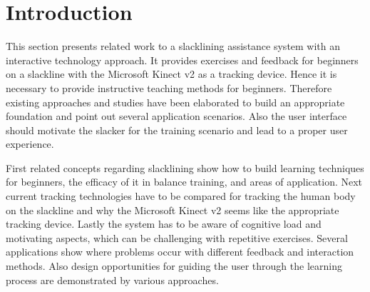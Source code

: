 \section{Introduction}

This section presents related work to a slacklining assistance system with an interactive technology approach. It provides exercises and feedback for beginners on a slackline with the Microsoft Kinect v2 as a tracking device. Hence it is necessary to provide instructive teaching methods for beginners. Therefore existing approaches and studies have been elaborated to build an appropriate foundation and point out several application scenarios. Also the user interface should motivate the slacker for the training scenario and lead to a proper user experience.

First related concepts regarding slacklining show how to build learning techniques for beginners, the efficacy of it in balance training, and areas of application. Next current tracking technologies have to be compared for tracking the human body on the slackline and why the Microsoft Kinect v2 seems like the appropriate tracking device. Lastly the system has to be aware of cognitive load and motivating aspects, which can be challenging with repetitive exercises. Several applications show where problems occur with different feedback and interaction methods. Also design opportunities for guiding the user through the learning process are demonstrated by various approaches.

